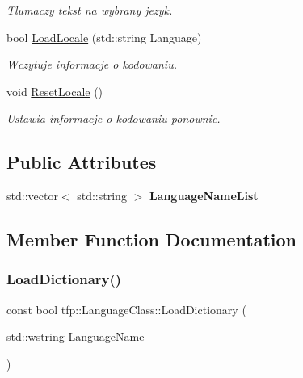 \begin{DoxyCompactItemize}
\begin{DoxyCompactList}\small\item\em Tlumaczy tekst na wybrany jezyk. \end{DoxyCompactList}\item 
\mbox{\label{classtfp_1_1_language_class_ac30f48e5111e90bca217a1e8f17db77a}} 
bool \mbox{\hyperlink{classtfp_1_1_language_class_ac30f48e5111e90bca217a1e8f17db77a}{Load\+Locale}} (std\+::string Language)
\begin{DoxyCompactList}\small\item\em Wczytuje informacje o kodowaniu. \end{DoxyCompactList}\item 
\mbox{\label{classtfp_1_1_language_class_a3b4023d8eb4719dde09261408fa4e80f}} 
void \mbox{\hyperlink{classtfp_1_1_language_class_a3b4023d8eb4719dde09261408fa4e80f}{Reset\+Locale}} ()
\begin{DoxyCompactList}\small\item\em Ustawia informacje o kodowaniu ponownie. \end{DoxyCompactList}\end{DoxyCompactItemize}
\subsection*{Public Attributes}
\begin{DoxyCompactItemize}
\item 
\mbox{\label{classtfp_1_1_language_class_a0b75791f74414d1557300b9c4305fbeb}} 
std\+::vector$<$ std\+::string $>$ {\bfseries Language\+Name\+List}
\end{DoxyCompactItemize}


\subsection{Member Function Documentation}
\mbox{\label{classtfp_1_1_language_class_af3f9a79c6d043fd46eeef94a9730e036}} 
\subsubsection{\texorpdfstring{Load\+Dictionary()}{LoadDictionary()}}
{\footnotesize\ttfamily const bool tfp\+::\+Language\+Class\+::\+Load\+Dictionary (\begin{DoxyParamCaption}\item[{std\+::wstring}]{Language\+Name }\end{DoxyParamCaption})}



